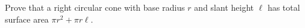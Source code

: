 Prove that a right circular cone with base radius $r$ and slant height $\ell$ has total surface area $\pi r^2+\pi r\ell$.
